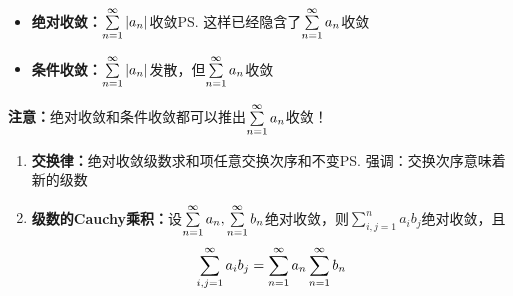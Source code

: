 \begin{itemize}
  \setlength{\itemindent}{1cm}
  \item {\bf 绝对收敛：}$\sum\limits_{n=1}^{\infty} |a_n|$收敛\ps{这样已经隐含了$\sum\limits_{n=1}^{\infty} a_n$收敛}
  \item {\bf 条件收敛：}$\sum\limits_{n=1}^{\infty} |a_n|$发散，但$\sum\limits_{n=1}^{\infty} a_n$收敛
\end{itemize}

{\b{\bf 注意：}绝对收敛和条件收敛都可以推出$\sum\limits_{n=1}^{\infty} a_n$收敛！}

\begin{enumerate}[(1)]
  \setlength{\itemindent}{1cm}
  \item {\bf 交换律：}绝对收敛级数求和项任意交换次序和不变\ps{强调：交换次序意味着新的级数}
  \item {\bf 级数的Cauchy乘积：}设$\sum\limits_{n=1}^{\infty} a_n,\sum\limits_{n=1}^{\infty}
	  b_n$绝对收敛，则$\sum\limits_{i,j=1}^na_ib_j$绝对收敛，且
	  $$\sum\limits_{i,j=1}^{\infty}a_ib_j=\sum\limits_{n=1}^{\infty} a_n\sum\limits_{n=1}^{\infty} b_n$$
\end{enumerate}

% 

